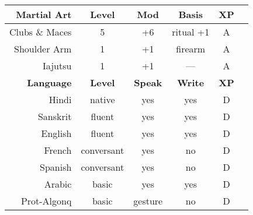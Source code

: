 \documentclass[11pt]{article}
\newcommand{\heading}[1]{{\sc\bfseries #1}}
\begin{document}
\begin{tabular}[t]{|r|c|c|c|c|c|}
\hline
%
%
\heading{Martial Art} & \heading{Level} & \heading{Mod} & \heading{Basis} & \heading{XP}
\\ \hline \hline
\sc Clubs \& Maces & 5 & +6 & ritual +1 & A
\\
\sc Shoulder Arm & 1 & +1 & firearm & A
\\
\sc Iajutsu & 1 & +1 & --- & A
\\[12pt] \hline \hline
%
\heading{Language} & \heading{Level} & \heading{Speak} & \heading{Write} & \heading{XP}
\\ \hline \hline
\sc Hindi & native & yes & yes & D
\\
\sc Sanskrit & fluent & yes & yes & D
\\
\sc English & fluent & yes & yes & D
\\
\sc French & conversant & yes & no & D
\\
\sc Spanish & conversant & yes & no & D
\\
\sc Arabic & basic & yes & yes & D
\\
\sc Prot-Algonq & basic & gesture & no & D
\\ \hline
\end{tabular}
\end{document}

